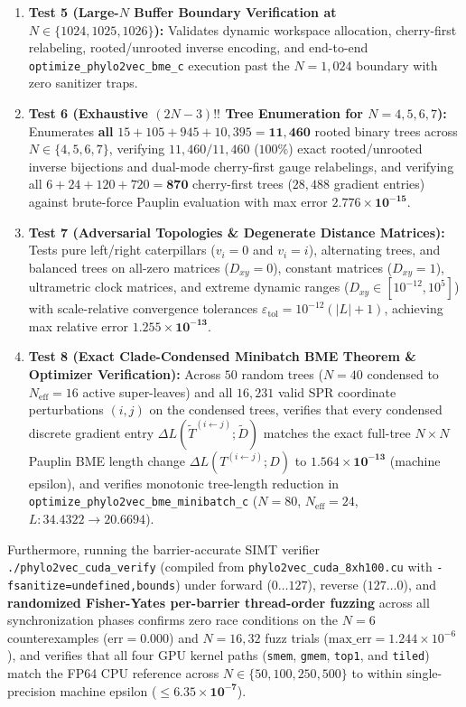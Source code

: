 \documentclass[11pt,a4paper]{article}
\theoremstyle{definition}
\begin{document}
\begin{enumerate}
    \item \textbf{Test 5 (Large-$N$ Buffer Boundary Verification at $N \in \{1024, 1025, 1026\}$):} Validates dynamic workspace allocation, cherry-first relabeling, rooted/unrooted inverse encoding, and end-to-end \texttt{optimize\_phylo2vec\_bme\_c} execution past the $N=1{,}024$ boundary with zero sanitizer traps.
    \item \textbf{Test 6 (Exhaustive $(2N-3)!!$ Tree Enumeration for $N = 4, 5, 6, 7$):} Enumerates \textbf{all} $15 + 105 + 945 + 10{,}395 = \mathbf{11{,}460}$ rooted binary trees across $N \in \{4, 5, 6, 7\}$, verifying $11{,}460 / 11{,}460$ ($100\%$) exact rooted/unrooted inverse bijections and dual-mode cherry-first gauge relabelings, and verifying all $6 + 24 + 120 + 720 = \mathbf{870}$ cherry-first trees ($28{,}488$ gradient entries) against brute-force Pauplin evaluation with max error $\mathbf{2.776 \times 10^{-15}}$.
    \item \textbf{Test 7 (Adversarial Topologies \& Degenerate Distance Matrices):} Tests pure left/right caterpillars ($v_i = 0$ and $v_i = i$), alternating trees, and balanced trees on all-zero matrices ($D_{xy} = 0$), constant matrices ($D_{xy} = 1$), ultrametric clock matrices, and extreme dynamic ranges ($D_{xy} \in [10^{-12}, 10^5]$) with scale-relative convergence tolerances $\varepsilon_{\text{tol}} = 10^{-12}(|L| + 1)$, achieving max relative error $\mathbf{1.255 \times 10^{-13}}$.
    \item \textbf{Test 8 (Exact Clade-Condensed Minibatch BME Theorem \& Optimizer Verification):} Across $50$ random trees ($N = 40$ condensed to $N_{\text{eff}} = 16$ active super-leaves) and all $16{,}231$ valid SPR coordinate perturbations $(i, j)$ on the condensed trees, verifies that every condensed discrete gradient entry $\Delta L(\widetilde{T}^{(i \leftarrow j)}; \widetilde{D})$ matches the exact full-tree $N \times N$ Pauplin BME length change $\Delta L(T^{(i \leftarrow j)}; D)$ to $\mathbf{1.564 \times 10^{-13}}$ (machine epsilon), and verifies monotonic tree-length reduction in \texttt{optimize\_phylo2vec\_bme\_minibatch\_c} ($N = 80$, $N_{\text{eff}} = 24$, $L: 34.4322 \to 20.6694$).
\end{enumerate}

Furthermore, running the barrier-accurate SIMT verifier \texttt{./phylo2vec\_cuda\_verify} (compiled from \texttt{phylo2vec\_cuda\_8xh100.cu} with \texttt{-fsanitize=undefined,bounds}) under forward ($0 \dots 127$), reverse ($127 \dots 0$), and \textbf{randomized Fisher-Yates per-barrier thread-order fuzzing} across all synchronization phases confirms zero race conditions on the $N=6$ counterexamples ($\text{err} = 0.000$) and $N=16, 32$ fuzz trials ($\text{max\_err} = 1.244 \times 10^{-6}$), and verifies that all four GPU kernel paths (\texttt{smem}, \texttt{gmem}, \texttt{top1}, and \texttt{tiled}) match the FP64 CPU reference across $N \in \{50, 100, 250, 500\}$ to within single-precision machine epsilon ($\le \mathbf{6.35 \times 10^{-7}}$).
\end{document}
